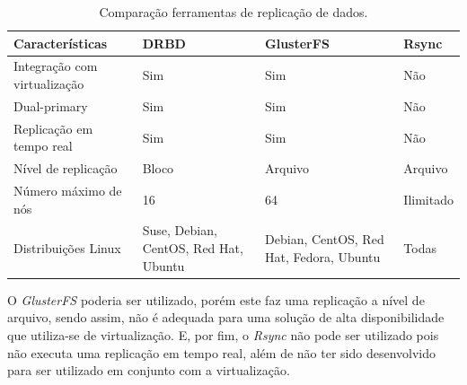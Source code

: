 \begin{table}[h!]
\caption{Comparação ferramentas de replicação de dados.}
\label{tab:replicacao}
\begin{center}
\begin{tabular}{|l|p{3.5cm}|p{3.5cm}|p{2cm}|}\hline
\textbf{Características} & \textbf{DRBD} & \textbf{GlusterFS} & \textbf{Rsync} \\\hline
Integração com virtualização & Sim & Sim & Não \\\hline
Dual-primary & Sim & Sim & Não \\\hline
Replicação em tempo real & Sim & Sim & Não \\\hline
Nível de replicação & Bloco & Arquivo & Arquivo \\\hline
Número máximo de nós & 16 & 64 & Ilimitado \\\hline
Distribuições Linux & Suse, Debian, CentOS, Red Hat, Ubuntu & Debian, CentOS, Red Hat, Fedora, Ubuntu & Todas \\\hline
\end{tabular}
\end{center}
\end{table}

O \textit{GlusterFS} poderia ser utilizado, porém este faz uma replicação a nível de arquivo, sendo assim, não é adequada para uma 
solução de alta disponibilidade que utiliza-se de virtualização. 
E, por fim, o \textit{Rsync} não pode ser utilizado pois não executa uma replicação em tempo real, além de não ter sido desenvolvido para
ser utilizado em conjunto com a virtualização.





